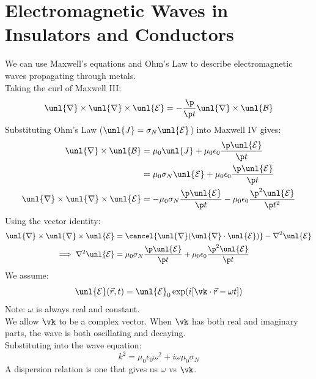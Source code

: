 \documentclass[a4paper, 11pt, normalem]{report}
\renewcommand\E{\mathcal{E}}
\newcommand\uE{\unl{\E}}
\renewcommand\B{\mathcal{B}}
\newcommand\uB{\unl{\B}}
\renewcommand\del{\unl{\nabla}}
\newcommand\eno{\epsilon_0}
\newcommand\J{\unl{J}}
\begin{document}
\section{Electromagnetic Waves in Insulators and Conductors}
We can use Maxwell's equations and Ohm's Law to describe electromagnetic waves propagating through metals. \\
Taking the curl of Maxwell \RN{3}:
\begin{equation}
    \del \times \del \times \uE = -\frac{\p}{\p t}\del \times \uB
\end{equation}
Substituting Ohm's Law ($\J = \sigma_N\uE$) into Maxwell \RN{4} gives:
\begin{align}
    \del\times\uB &= \mu_0\J + \mu_0\eno\frac{\p \uE}{\p t} \\
    &= \mu_0\sigma_N\uE + \mu_0\eno\frac{\p\uE}{\p t} \\
    \del \times \del \times \uE &= -\mu_0\sigma_N\frac{\p\uE}{\p t} - \mu_0\eno\frac{\p^2\uE}{\p t^2}
\end{align}
Using the vector identity:
\begin{align}
    \del\times\del\times\uE &= \cancel{\del(\del\cdot\uE)} - \nabla^2\uE \\
    \implies \nabla^2\uE &= \mu_0\sigma_N\frac{\p\uE}{\p t} + \mu_0\eno\frac{\p^2\uE}{\p t}
\end{align}
We assume:
\begin{equation}
    \uE(\vec{r},t) = \uE_0\exp(i[\vk\cdot\vec{r}-\omega t])
\end{equation}
Note: $\omega$ is always real and constant. \\
We allow $\vk$ to be a complex vector.
When $\vk$ has both real and imaginary parts, the wave is both oscillating and decaying. \\
Substituting into the wave equation:
\begin{equation}
    k^2 = \mu_0\eno\omega^2 + i\omega\mu_0\sigma_N \tag{Dispersion Relation}
\end{equation}
A dispersion relation is one that gives us $\omega$ vs $\vk$.
\end{document}
